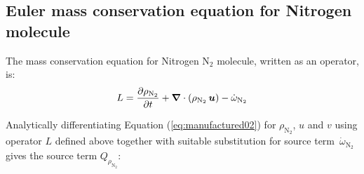 \documentclass[10pt]{article}
\newcommand{\diff}[2] {\dfrac{\partial #1 }{\partial #2}}
\newcommand{\gv}[1]{\ensuremath{\mbox{\boldmath$ #1 $}}}%
\newcommand{\grad}[1]{\gv{\nabla} #1}
\newcommand{\bv}[1]{\ensuremath{\mbox{\boldmath$ #1 $}}}
\begin{document}
\begin{landscape}
\section{Euler mass conservation equation for Nitrogen molecule}

The mass conservation equation for Nitrogen $\text{N}_2$ molecule, written as an operator, is:
\begin{equation}
 \label{eq:euler2d_11a}
L= \diff{\rho_{\text{N}_2}}{t} + \grad{}\cdot \left(\rho_{\text{N}_2}\,\bv{u}\right) - \dot{\omega}_{\text{N}_2}
\end{equation}

Analytically differentiating Equation (\ref{eq:manufactured02}) for $\rho_{\text{N}_2}$, $u$ and $v$ using operator $L$ defined above together with suitable substitution for source term~$\dot{\omega}_{\text{N}_2}$ gives the source term $Q_{\rho_{\text{N}_2}}$:


\end{landscape}
\end{document}
